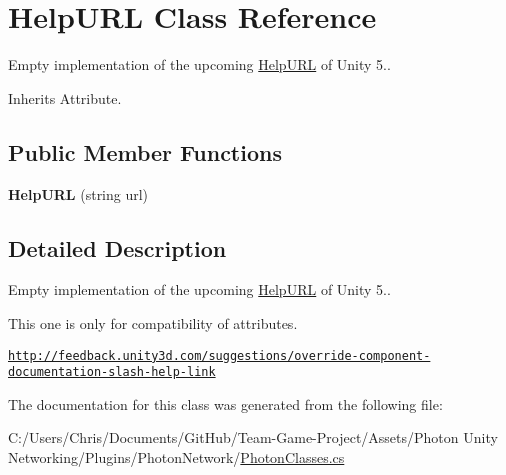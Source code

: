 \hypertarget{class_help_u_r_l}{}\section{Help\+U\+RL Class Reference}
\label{class_help_u_r_l}


Empty implementation of the upcoming \hyperlink{class_help_u_r_l}{Help\+U\+RL} of Unity 5..  




Inherits Attribute.

\subsection*{Public Member Functions}
\begin{DoxyCompactItemize}
\item 
{\bfseries Help\+U\+RL} (string url)\hypertarget{class_help_u_r_l_a05ccd7cc690df9533724d2c7cc8419d8}{}\label{class_help_u_r_l_a05ccd7cc690df9533724d2c7cc8419d8}

\end{DoxyCompactItemize}


\subsection{Detailed Description}
Empty implementation of the upcoming \hyperlink{class_help_u_r_l}{Help\+U\+RL} of Unity 5.. 

This one is only for compatibility of attributes.

\href{http://feedback.unity3d.com/suggestions/override-component-documentation-slash-help-link}{\tt http\+://feedback.\+unity3d.\+com/suggestions/override-\/component-\/documentation-\/slash-\/help-\/link}

The documentation for this class was generated from the following file\+:\begin{DoxyCompactItemize}
\item 
C\+:/\+Users/\+Chris/\+Documents/\+Git\+Hub/\+Team-\/\+Game-\/\+Project/\+Assets/\+Photon Unity Networking/\+Plugins/\+Photon\+Network/\hyperlink{_photon_classes_8cs}{Photon\+Classes.\+cs}\end{DoxyCompactItemize}
